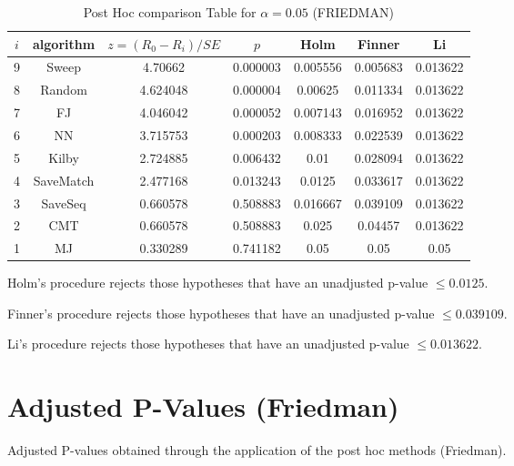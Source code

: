 \documentclass[a4paper,10pt]{article}
\begin{document}
\begin{landscape}
\begin{table}[!htp]
\centering\footnotesize
\begin{tabular}{ccccccc}
$i$&algorithm&$z=(R_0 - R_i)/SE$&$p$&Holm &Finner&Li\\
\hline9&Sweep&4.70662&0.000003&0.005556&0.005683&0.013622\\8&Random&4.624048&0.000004&0.00625&0.011334&0.013622\\7&FJ&4.046042&0.000052&0.007143&0.016952&0.013622\\6&NN&3.715753&0.000203&0.008333&0.022539&0.013622\\5&Kilby&2.724885&0.006432&0.01&0.028094&0.013622\\4&SaveMatch&2.477168&0.013243&0.0125&0.033617&0.013622\\3&SaveSeq&0.660578&0.508883&0.016667&0.039109&0.013622\\2&CMT&0.660578&0.508883&0.025&0.04457&0.013622\\1&MJ&0.330289&0.741182&0.05&0.05&0.05\\\hline
\end{tabular}
\caption{Post Hoc comparison Table for $\alpha=0.05$ (FRIEDMAN)}
\end{table}Holm's procedure rejects those hypotheses that have an unadjusted p-value $\le0.0125$.

Finner's procedure rejects those hypotheses that have an unadjusted p-value $\le0.039109$.

Li's procedure rejects those hypotheses that have an unadjusted p-value $\le0.013622$.


\newpage

\section{Adjusted P-Values (Friedman)}


Adjusted P-values obtained through the application of the post hoc methods (Friedman).


\end{landscape}
\end{document}
